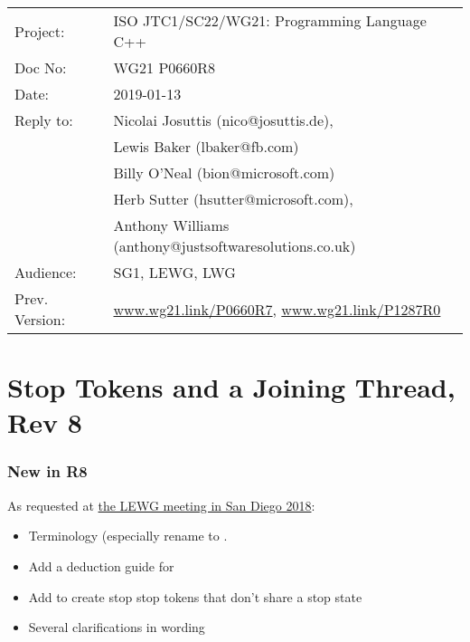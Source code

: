 
{\small
\begin{tabular}{@{}ll}
Project:  	& ISO JTC1/SC22/WG21: Programming Language C++ \\
Doc No: 	& WG21 P0660R8 \\
Date: 		& 2019-01-13 \\
Reply to: 	& Nicolai Josuttis (nico@josuttis.de), \\
                &         Lewis Baker (lbaker@fb.com) \\
                &         Billy O'Neal (bion@microsoft.com) \\
                &         Herb Sutter (hsutter@microsoft.com), \\
                &         Anthony Williams (anthony@justsoftwaresolutions.co.uk) \\
Audience: 	& SG1, LEWG, LWG \\
Prev. Version:	& \url{www.wg21.link/P0660R7}, \url{www.wg21.link/P1287R0} \\
\end{tabular}
}

\section*{{\huge{}Stop Tokens and a Joining Thread, Rev 8}}

\subsubsection*{New in R8}
As requested at
\href{http://wiki.edg.com/bin/view/Wg21sandiego2018/P0660}{the LEWG meeting in San Diego 2018}:
\begin{itemize}
 \item Terminology (especially rename  to .
 \item Add a deduction guide for 
 \item Add  to create stop stop tokens that don't share a stop state
 \item Several clarifications in wording
\end{itemize}


